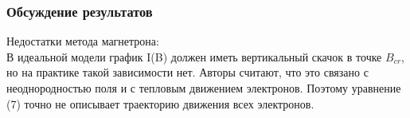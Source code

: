 \documentclass{beamer}
\begin{document}
\begin{frame}
\frametitle{Обсуждение результатов}
Недостатки метода магнетрона:\\
В идеальной модели график I(B) должен иметь вертикальный скачок в точке $B_{cr}$, но на практике такой зависимости нет. Авторы считают, что это связано с неоднородностью поля и с тепловым движением электронов. Поэтому уравнение (7) точно не описывает траекторию движения всех электронов.

\end{frame}
\end{document}
